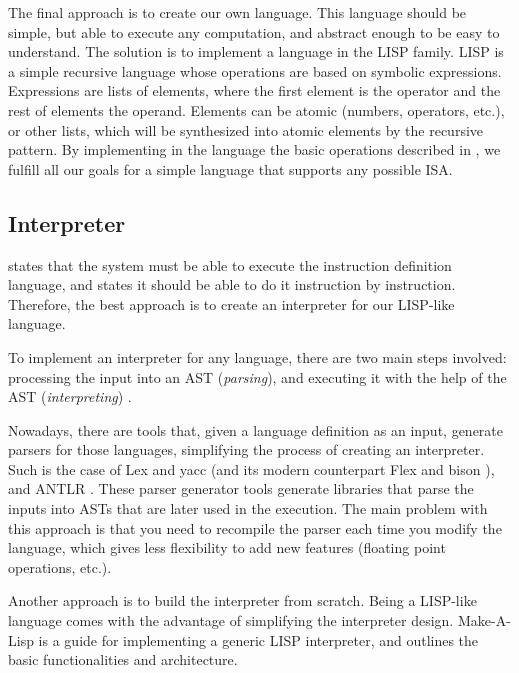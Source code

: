 The final approach is to create our own language. This language should be simple, but able to execute any computation, and abstract enough to be easy to understand. The solution is to implement a language in the LISP family. LISP \parencite{mccarthy1960recursive} is a simple recursive language whose operations are based on symbolic expressions. Expressions are lists of elements, where the first element is the operator and the rest of elements the operand. Elements can be atomic (numbers, operators, etc.), or other lists, which will be synthesized into atomic elements by the recursive pattern. By implementing in the language the basic operations described in , we fulfill all our goals for a simple language that supports any possible \gls{ISA}. 


\subsection{Interpreter}
 states that the system must be able to execute the \gls{instruction} definition language, and  states it should be able to do it \gls{instruction} by instruction. Therefore, the best approach is to create an \gls{interpreter} for our LISP-like language.

To implement an \gls{interpreter} for any language, there are two main steps involved: processing the input into an \gls{AST} (\textit{parsing}), and executing it with the help of the \gls{AST} (\textit{interpreting}) \parencite{mogensen2009basics}.

Nowadays, there are tools that, given a language definition as an input, generate parsers for those languages, simplifying the process of creating an \gls{interpreter}. Such is the case of Lex and yacc \parencite{LevineJohnR1992Ly} (and its modern counterpart Flex and bison \parencite{LevineJohnR2009Fb}), and ANTLR \parencite{ParrTerenceTerenceJohn2010Lip}%
. These parser generator tools generate libraries that parse the inputs into \glspl{AST} that are later used in the execution. The main problem with this approach is that you need to recompile the parser each time you modify the language, which gives less flexibility to add new features (floating point operations, etc.).

Another approach is to build the \gls{interpreter} from scratch. Being a LISP-like language comes with the advantage of simplifying the \gls{interpreter} design. Make-A-Lisp \parencite{mal} is a guide for implementing a generic LISP \gls{interpreter}, and outlines the basic functionalities and architecture.


